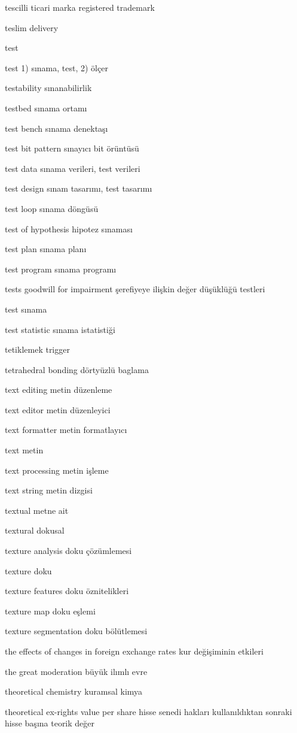 \documentclass[12pt,fleqn]{article}\usepackage{../../common}
\begin{document}
tescilli ticari marka registered trademark

teslim delivery

test

test 1) sınama, test, 2) ölçer

testability sınanabilirlik

testbed sınama ortamı

test bench sınama denektaşı

test bit pattern sınayıcı bit örüntüsü

test data sınama verileri, test verileri

test design sınam tasarımı, test tasarımı

test loop sınama döngüsü

test of hypothesis hipotez sınaması

test plan sınama planı

test program sınama programı

tests goodwill for impairment şerefiyeye ilişkin değer düşüklüğü testleri

test sınama

test statistic sınama istatistiği

tetiklemek trigger

tetrahedral bonding dörtyüzlü baglama

text editing metin düzenleme

text editor metin düzenleyici

text formatter metin formatlayıcı

text metin

text processing metin işleme

text string metin dizgisi

textual metne ait

textural dokusal

texture analysis doku çözümlemesi

texture doku

texture features doku öznitelikleri

texture map doku eşlemi

texture segmentation doku bölütlemesi

the effects of changes in foreign exchange rates kur değişiminin etkileri

the great moderation büyük ilımlı evre

theoretical chemistry kuramsal kimya

theoretical ex-rights value per share hisse senedi hakları kullanıldıktan sonraki hisse başına teorik değer
\end{document}
